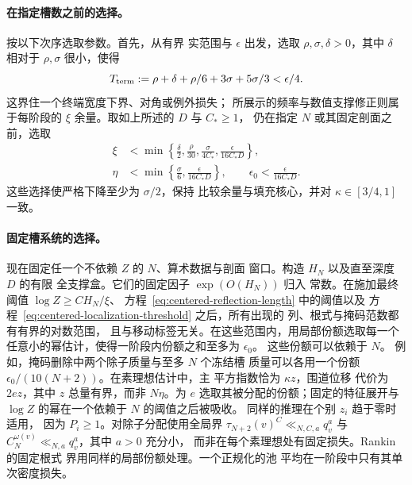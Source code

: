 \documentclass[11pt,a4paper]{article}
\numberwithin{equation}{section}
\numberwithin{figure}{section}
\theoremstyle{definition}
\theoremstyle{remark}
\begin{document}
\paragraph{在指定槽数之前的选择。}
按以下次序选取参数。首先，从有界
实范围与 \(\epsilon\) 出发，选取 \(\rho,\sigma,\delta>0\)，其中
\(\delta\) 相对于 \(\rho,\sigma\) 很小，使得
\[
 T_{\rm term}:=\rho+\delta+\rho/6+3\sigma+5\sigma/3<\epsilon/4.
\]
这界住一个终端宽度下界、对角或例外损失；
所展示的频率与数值支撑修正则属于每阶段的
\(\xi\) 余量。取如上所述的 \(D\) 与 \(C_*\ge1\)，
仍在指定 \(N\) 或其固定剖面之前，选取
\begin{equation}
 \begin{aligned}
 \xi&<\min\left\{\frac\delta2,\frac\rho{30},
                  \frac{\sigma}{4C_*},
                  \frac{\epsilon}{16C_*D}\right\},\\
 \eta&<\min\left\{\frac\sigma6,
                   \frac{\epsilon}{16C_*D}\right\},\qquad
 \epsilon_0<\frac{\epsilon}{16C_*D}.
 \end{aligned}
 \label{old-eq:2.1i}
\end{equation}
这些选择使严格下降至少为 \(\sigma/2\)，保持
比较余量与填充核心，并对
\(\kappa\in[3/4,1]\) 一致。

\paragraph{固定槽系统的选择。}
现在固定任一个不依赖 \(Z\) 的 \(N\)、算术数据与剖面
窗口。构造 \(H_N\) 以及直至深度 \(D\) 的有限
全支撑盒。它们的固定因子 \(\exp(O(H_N))\) 归入
常数。在施加最终阈值
\(\log Z\ge C H_N/\xi\)、
方程~\eqref{eq:centered-reflection-length} 中的阈值以及
方程~\eqref{eq:centered-localization-threshold} 之后，所有出现的
列、根式与掩码范数都有有界的对数范围，
且与移动标签无关。在这些范围内，用局部份额选取每一个
任意小的幂估计，使得一阶段内份额之和至多为 \(\epsilon_0\)。
这些份额可以依赖于 \(N\)。
例如，掩码删除中两个除子质量与至多 \(N\) 个冻结槽
质量可以各用一个份额
\(\epsilon_0/(10(N+2))\)。在素理想估计中，主
平方指数恰为 \(\kappa z\)，围道位移
代价为 \(2e z\)，其中 \(z\) 总量有界，而非 \(N\eta\)。为
\(e\) 选取其被分配的份额；固定的特征展开与
\(\log Z\) 的幂在一个依赖于 \(N\) 的阈值之后被吸收。
同样的推理在个别 \(z_i\) 趋于零时适用，
因为 \(P_i\ge1\)。对除子分配使用全局界
\(\tau_{N+2}(v)^C\ll_{N,C,a}q_v^a\) 与
\(C_N^{\omega(v)}\ll_{N,a}q_v^a\)，其中 \(a>0\) 充分小，
而非在每个素理想处有固定损失。Rankin 的固定根式
界用同样的局部份额处理。一个正规化的池
平均在一阶段中只有其单次密度损失。
\end{document}
